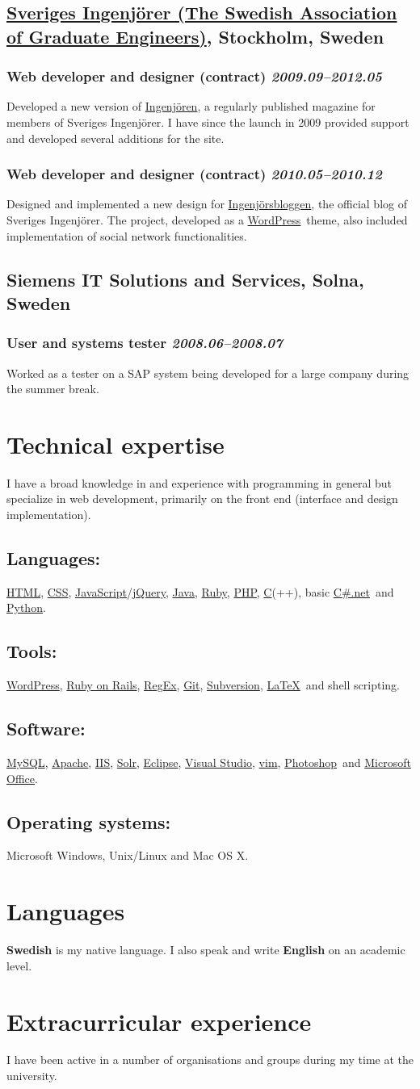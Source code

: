 \documentclass[a4paper,11pt]{article}
\newcommand{\icon}[1]{\textcolor{lightgray}{#1}}
\newcommand{\iconl}[1]{\hspace{-0.5cm}\makebox[0.3cm][c]{\icon{#1}}\hspace{0.2cm}}
\newcommand{\worktitle}[1]{\textbf{#1}}
\newcommand{\duration}[1]{\textsl{#1}}
\newcommand{\theplace}[2][]{\subsection*{\textbf{#2}#1}}
\newcommand{\thework}[2]{\subsubsection*{%
  \iconl{$\blacksquare$}%
  \worktitle{#1}%
  \hfill\duration{#2}}\par%
}
\newcommand{\thebold}[1]{\subsection*{\textbf{#1}}\vspace{-1mm}}
\def\html{\href{http://en.wikipedia.org/wiki/HTML}{HTML}}
\def\javascript{\href{http://en.wikipedia.org/wiki/JavaScript}{JavaScript}}
\def\css{\href{http://en.wikipedia.org/wiki/Cascading_Style_Sheets}{CSS}}
\def\clang{\href{http://en.wikipedia.org/wiki/C_\%28programming_language\%29}{C}}
\def\regex{\href{http://en.wikipedia.org/wiki/Regular_expressions}{RegEx}}
\def\git{\href{http://git-scm.com/}{Git}}
\def\svn{\href{http://subversion.apache.org/}{Subversion}}
\def\jquery{\href{http://jquery.com/}{jQuery}}
\def\wordpress{\href{http://wordpress.org}{WordPress}}
\def\ror{\href{http://rubyonrails.org}{Ruby on Rails}}
\def\java{\href{http://www.java.com/}{Java}}
\def\php{\href{http://php.net}{PHP}}
\def\ruby{\href{http://www.ruby-lang.org/}{Ruby}}
\def\csharp{\href{http://en.wikipedia.org/wiki/C_Sharp_\%28programming_language\%29}{C\#.net}}
\def\python{\href{http://www.python.org/}{Python}}
\def\mysql{\href{http://www.mysql.com/}{MySQL}}
\def\apache{\href{http://httpd.apache.org/}{Apache}}
\def\iis{\href{http://www.iis.net/}{IIS}}
\def\solr{\href{http://lucene.apache.org/solr/}{Solr}}
\def\eclipse{\href{http://www.eclipse.org/eclipse/}{Eclipse}}
\def\vs{\href{http://www.microsoft.com/visualstudio/}{Visual Studio}}
\def\vim{\href{http://www.vim.org/}{vim}}
\def\photoshop{\href{http://www.adobe.com/products/photoshop.html}{Photoshop}}
\def\office{\href{http://office.microsoft.com/}{Microsoft Office}}
\def\latex{\href{http://en.wikipedia.org/wiki/LaTeX}{LaTeX}}
\begin{document}
\theplace[, Stockholm, Sweden]{\href{http://www.sverigesingenjorer.se}{Sveriges Ingenjörer (The Swedish Association of Graduate Engineers)}}

\thework{Web developer and designer (contract)}{2009.09--2012.05}
Developed a new version of \href{http://www.ingenjoren.se}{Ingenjören}, a regularly published magazine for members of Sveriges Ingenjörer. I have since the launch in 2009 provided support and developed several additions for the site.

\thework{Web developer and designer (contract)}{2010.05--2010.12}
Designed and implemented a new design for \href{http://www.ingenjorsbloggen.se}{Ingenjörsbloggen}, the official blog of Sveriges Ingenjörer. The project, developed as a \wordpress\ theme, also included implementation of social network functionalities.

\theplace[, Solna, Sweden]{Siemens IT Solutions and Services}

\thework{User and systems tester}{2008.06--2008.07}
Worked as a tester on a SAP system being developed for a large company during the summer break.

\section*{Technical expertise}%
I have a broad knowledge in and experience with programming in general but specialize in web development, primarily on the front end (interface and design implementation).

\thebold{Languages:} \html, \css, \javascript/\jquery, \java, \ruby, \php, \clang(++), basic \csharp\ and \python.

\thebold{Tools:} \wordpress, \ror, \regex, \git, \svn, \latex\ and shell scripting.

\thebold{Software:} \mysql, \apache, \iis, \solr, \eclipse, \vs, \vim, \photoshop\ and \office.

\thebold{Operating systems:} Microsoft Windows, Unix/Linux and Mac OS X.
\section*{Languages}%
\textbf{Swedish} is my native language. I also speak and write \textbf{English} on an academic level.
\section*{Extracurricular  experience}%
I have been active in a number of organisations and groups during my time at the university.
\end{document}
